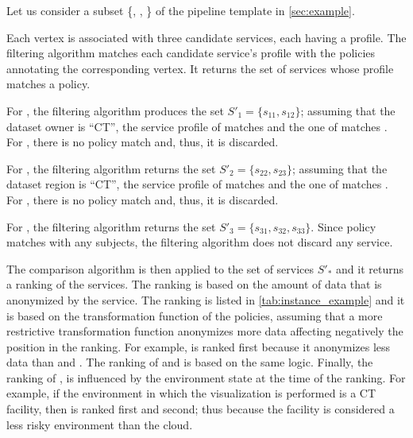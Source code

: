 \begin{example}[\bf \pipelineInstance]\label{ex:instance}

  Let us consider a subset \{, , \} of the pipeline template \tChartFunction in \cref{sec:example}.

  Each vertex is associated with three candidate services, each having a profile. The filtering algorithm matches each candidate service's profile with the policies annotating the corresponding vertex. It returns the set of services whose profile matches a policy.
  \begin{enumerate*}[label=\textit{\roman*})]
    \item For , the filtering algorithm produces the set $S'_1=\{s_{11},s_{12}\}$; assuming that the dataset owner is ``CT'', the service profile of  matches  and the one of  matches .
          For , there is no policy match and, thus, it is discarded.
    \item For , the filtering algorithm returns the set $S'_2=\{s_{22},s_{23}\}$; assuming that the dataset region is ``CT'', the service profile of  matches  and the one of  matches .
          For , there is no policy match and, thus, it is discarded.
    \item For , the filtering algorithm returns the set $S'_3=\{s_{31},s_{32},s_{33}\}$. Since policy  matches with any subjects, the filtering algorithm does not discard any service.
  \end{enumerate*}

  The comparison algorithm is then applied to the set of services $S'_*$ and it returns a ranking of the services.
  The ranking is based on the amount of data that is anonymized by the service.
  The ranking is listed in \cref{tab:instance_example} and it is based on the transformation function of the policies,
  assuming that a more restrictive transformation function anonymizes more data affecting negatively the position in the ranking.
  For example,  is ranked first because it anonymizes less data than  and .
  The ranking of  and  is based on the same logic.
  Finally, the ranking of ,  is influenced by the environment state at the time of the ranking.
  For example, if the environment in which the visualization is performed is a CT facility, then  is ranked first and  second;
  thus because the facility is considered a less risky environment than the cloud.




\end{example}
